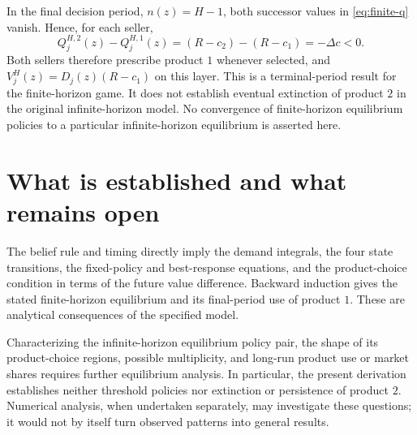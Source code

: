 \documentclass[11pt]{article}
\begin{document}
In the final decision period, $n(z)=H-1$, both successor values in
\eqref{eq:finite-q} vanish. Hence, for each seller,
\begin{equation}\label{eq:final-product}
Q_j^{H,2}(z)-Q_j^{H,1}(z)
=(R-c_2)-(R-c_1)=-\Delta c<0.
\end{equation}
Both sellers therefore prescribe product $1$ whenever selected, and
$V_j^H(z)=D_j(z)(R-c_1)$ on this layer. This is a terminal-period
result for the finite-horizon game. It does not establish eventual
extinction of product $2$ in the original infinite-horizon model.
No convergence of finite-horizon equilibrium policies to a particular
infinite-horizon equilibrium is asserted here.

\section{What is established and what remains open}

The belief rule and timing directly imply the demand integrals, the
four state transitions, the fixed-policy and best-response equations,
and the product-choice condition in terms of the future value difference.
Backward induction gives the stated finite-horizon equilibrium and its
final-period use of product $1$. These are analytical consequences
of the specified model.

Characterizing the infinite-horizon equilibrium policy pair, the shape
of its product-choice regions, possible multiplicity, and long-run
product use or market shares requires further equilibrium analysis.
In particular, the present derivation establishes neither threshold
policies nor extinction or persistence of product $2$. Numerical
analysis, when undertaken separately, may investigate these questions;
it would not by itself turn observed patterns into general results.
\end{document}
